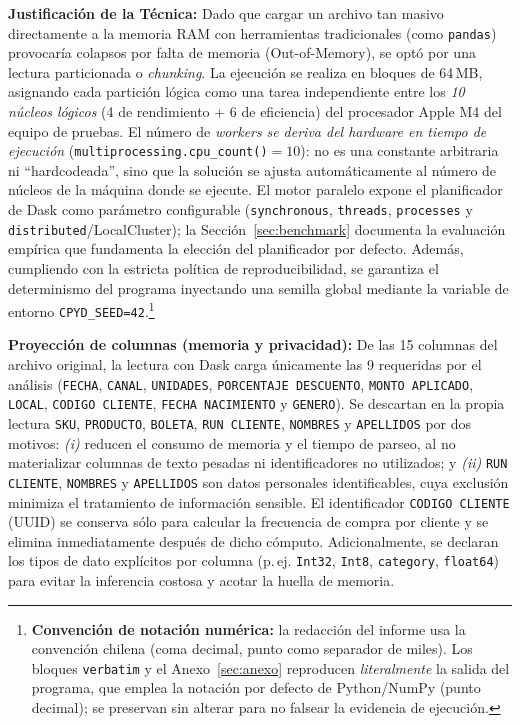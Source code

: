 \documentclass[12pt,letterpaper]{article}
\begin{document}
\textbf{Justificación de la Técnica:} Dado que cargar un archivo tan masivo directamente a la memoria RAM con herramientas tradicionales (como \texttt{pandas}) provocaría colapsos por falta de memoria (Out-of-Memory), se optó por una lectura particionada o \textit{chunking}. La ejecución se realiza en bloques de 64\,MB, asignando cada partición lógica como una tarea independiente entre los \textit{10 núcleos lógicos} (4 de rendimiento + 6 de eficiencia) del procesador Apple M4 del equipo de pruebas. El número de \textit{workers} \textit{se deriva del hardware en tiempo de ejecución} (\texttt{multiprocessing.cpu\_count()}$=10$): no es una constante arbitraria ni ``hardcodeada'', sino que la solución se ajusta automáticamente al número de núcleos de la máquina donde se ejecute. El motor paralelo expone el planificador de Dask como parámetro configurable (\texttt{synchronous}, \texttt{threads}, \texttt{processes} y \texttt{distributed}/LocalCluster); la Sección~\ref{sec:benchmark} documenta la evaluación empírica que fundamenta la elección del planificador por defecto.
Además, cumpliendo con la estricta política de reproducibilidad, se garantiza el determinismo del programa inyectando una semilla global mediante la variable de entorno \texttt{CPYD\_SEED=42}.\footnote{\textbf{Convención de notación numérica:} la redacción del informe usa la convención chilena (coma decimal, punto como separador de miles). Los bloques \texttt{verbatim} y el Anexo~\ref{sec:anexo} reproducen \textit{literalmente} la salida del programa, que emplea la notación por defecto de Python/NumPy (punto decimal); se preservan sin alterar para no falsear la evidencia de ejecución.}

\textbf{Proyección de columnas (memoria y privacidad):} De las 15 columnas del archivo original, la lectura con Dask carga únicamente las 9 requeridas por el análisis (\texttt{FECHA}, \texttt{CANAL}, \texttt{UNIDADES}, \texttt{PORCENTAJE DESCUENTO}, \texttt{MONTO APLICADO}, \texttt{LOCAL}, \texttt{CODIGO CLIENTE}, \texttt{FECHA NACIMIENTO} y \texttt{GENERO}). Se descartan en la propia lectura \texttt{SKU}, \texttt{PRODUCTO}, \texttt{BOLETA}, \texttt{RUN CLIENTE}, \texttt{NOMBRES} y \texttt{APELLIDOS} por dos motivos: \textit{(i)} reducen el consumo de memoria y el tiempo de parseo, al no materializar columnas de texto pesadas ni identificadores no utilizados; y \textit{(ii)} \texttt{RUN CLIENTE}, \texttt{NOMBRES} y \texttt{APELLIDOS} son datos personales identificables, cuya exclusión minimiza el tratamiento de información sensible. El identificador \texttt{CODIGO CLIENTE} (UUID) se conserva sólo para calcular la frecuencia de compra por cliente y se elimina inmediatamente después de dicho cómputo. Adicionalmente, se declaran los tipos de dato explícitos por columna (p.\,ej. \texttt{Int32}, \texttt{Int8}, \texttt{category}, \texttt{float64}) para evitar la inferencia costosa y acotar la huella de memoria.
\end{document}
